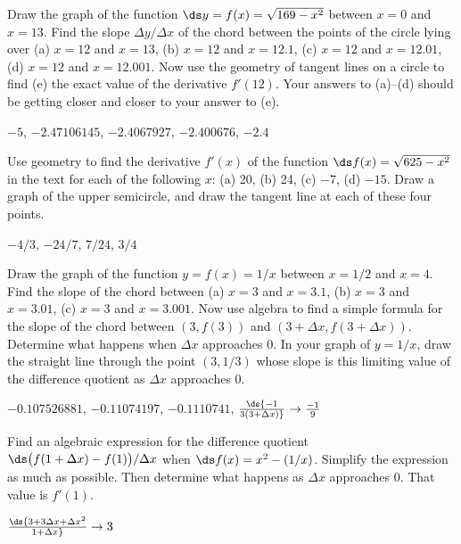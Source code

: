 \begin{exercises}

\begin{exercise}
Draw the graph of the function $\ds y=f(x)=\sqrt{169-x^2}$ between $x=0$
and $x=13$.  Find the slope $\Delta y/\Delta x$ of the chord between the
points of the circle lying over (a) $x=12$ and $x=13$, (b) $x=12$ and
$x=12.1$,  (c) $x=12$ and $x=12.01$, (d) $x=12$ and $x=12.001$.  Now use
the geometry of tangent lines on a circle to find (e) the exact value of the
derivative $f'(12)$.  Your answers to (a)--(d) should be getting closer and
closer to your answer to (e).
\begin{answer} $-5$, $-2.47106145$, $-2.4067927$, $-2.400676$, $-2.4$
\end{answer}\end{exercise}

\begin{exercise}
Use geometry to find the derivative $f'(x)$ of the function
$\ds f(x)=\sqrt{625-x^2}$ in the text for each of the following $x$: (a) 20,
(b) 24, (c) $-7$, (d) $-15$.  Draw a graph of the upper semicircle, and
draw the tangent line at each of these four points.
\begin{answer} $-4/3$, $-24/7$, $7/24$, $3/4$
\end{answer}\end{exercise}


\begin{exercise}
Draw the graph of the function $y=f(x)=1/x$ between $x=1/2$ and $x=4$.
Find the slope of the chord between (a) $x=3$ and $x=3.1$, (b) $x=3$ and
$x=3.01$, (c) $x=3$ and $x=3.001$.  Now use algebra to find a simple
formula for the slope of the chord between $(3,f(3))$ and $(3+\Delta
x,f(3+\Delta x))$.  Determine what happens when $\Delta x$ approaches 0.
In your graph of $y=1/x$, draw the straight line through the point
$(3,1/3)$ whose slope is this limiting value of the difference quotient as
$\Delta x$ approaches 0.
\begin{answer} $-0.107526881$, $-0.11074197$, $-0.1110741$, 
$\ds{-1\over3(3+\Delta x)}\rightarrow {-1\over9}$
\end{answer}\end{exercise}

\begin{exercise}
Find an algebraic expression for the difference quotient $\ds \bigl(f(1+\Delta
x)-f(1)\bigr)/\Delta x$ when $\ds f(x)=x^2-(1/x)$.  Simplify the expression as
much as possible.  Then determine what happens as $\Delta x$ approaches 0.
That value is $f'(1)$.
\begin{answer} $\ds{3+3\Delta x+\Delta x^2\over1+\Delta x}\rightarrow3$ 
\end{answer}\end{exercise}


\end{exercises}
